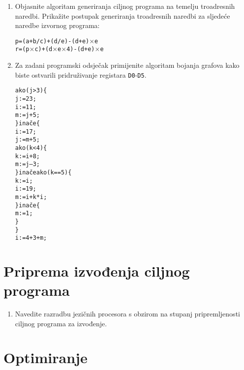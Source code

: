 \documentclass[times, 12pt, utf8]{book}
\begin{document}
\begin{enumerate}[resume]
\item
Objasnite algoritam generiranja ciljnog programa na temelju troadresnih naredbi.
Prikažite postupak generiranja troadresnih naredbi za sljedeće naredbe izvornog programa: \cite[str.~262-263, 276-279]{udzbenik} \cite{auditorne}

\begin{alltt}
p = (a + b/c) + (d/e)-(d+e) \(\times\) e
r = (p \(\times\) c) + (d \(\times\) e \(\times\) 4)-(d+e) \(\times\) e
\end{alltt} 

\item
Za zadani programski odsječak primijenite algoritam bojanja grafova kako biste ostvarili pridruživanje registara \texttt{D0}-\texttt{D5}. \cite[str.~269-273]{udzbenik}

\begin{alltt}
ako (j > 3) \verb|{|
   j : = 23;
   i := 11;
   m := j + 5;
\verb|}| inače \verb|{|
   i := 17;
   j := m + 5;
   ako (k < 4) \verb|{|
      k := i + 8;
      m := j – 3;
   \verb|}| inače ako (k == 5) \verb|{|
      k := i;
      i := 19;
      m := i + k * i;
   \verb|}| inače \verb|{|
      m := 1;
   \verb|}|
\verb|}|
i := 4 + 3+m;
\end{alltt} 

\end{enumerate}


\chapter{Priprema izvođenja ciljnog programa}


\begin{enumerate}[resume]

\item
Navedite razradbu jezičnih procesora s obzirom na stupanj pripremljenosti ciljnog programa za izvođenje. \cite[str.~286]{udzbenik}

\end{enumerate}


\chapter{Optimiranje}
\end{document}
